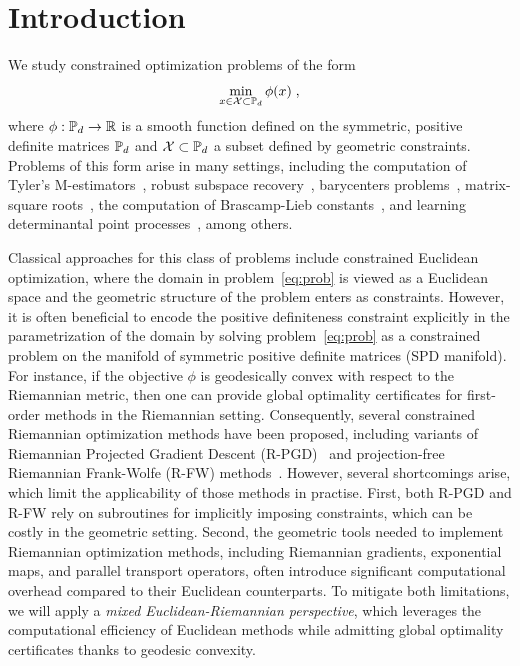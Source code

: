 \documentclass[sn-nature]{sn-jnl}%
\theoremstyle{thmstyleone}%
\theoremstyle{thmstyletwo}%
\theoremstyle{thmstylethree}%
\begin{document}
\section{Introduction}\label{sec1}

We study constrained optimization problems of the form
\begin{equation}\label{eq:prob}
	\min_{x \in \mathcal{X} \subset \mathbb{P}_d} \phi(x) \; ,
\end{equation}
where $\phi: \mathbb{P}_d \rightarrow \mathbb{R}$ is a smooth function defined on the 
symmetric, positive definite matrices $\mathbb{P}_d$ and $\mathcal{X} \subset \mathbb{P}_d$ a subset defined by geometric constraints. 
Problems of this form arise in many settings, including the computation of Tyler's M-estimators~\citep{tyler1987distribution,m-scatter,wiesel2012geodesic}, robust subspace recovery~\citep{zhang2016robust}, barycenters problems~\citep{sra2013sdivergence}, matrix-square roots~\citep{sra2015matrixsquareroot}, the computation of Brascamp-Lieb constants~\citep{weber2022computing}, and learning determinantal point processes~\citep{mariet2015fixed}, among others.

Classical approaches for this class of problems include constrained Euclidean optimization, where the domain in problem~\ref{eq:prob} is viewed as a Euclidean space and the geometric structure of the problem enters as constraints.  However, it is often beneficial to encode the positive definiteness constraint explicitly in the parametrization of the domain by solving problem~\ref{eq:prob} as a constrained problem on the manifold of symmetric positive definite matrices (SPD manifold). For instance, if the objective $\phi$ is geodesically convex with respect to the Riemannian metric, then one can provide global optimality certificates for first-order methods in the Riemannian setting. Consequently, several constrained Riemannian optimization methods have been proposed, including variants of Riemannian Projected Gradient Descent (R-PGD)~\cite{liu2019simple} and projection-free Riemannian Frank-Wolfe (R-FW) methods~\cite{frank-wolfe,weber2021projection}. 
However, several shortcomings arise, which limit the applicability of those methods in practise.  First, both R-PGD and R-FW rely on subroutines for implicitly imposing constraints, which can be costly in the geometric setting.  Second,  the geometric tools needed to implement Riemannian optimization methods, including Riemannian gradients, exponential maps, and parallel transport operators, often introduce significant computational overhead compared to their Euclidean counterparts.  To mitigate both limitations, we will apply a \emph{mixed Euclidean-Riemannian perspective}, which leverages the computational efficiency of Euclidean methods while admitting global optimality certificates thanks to geodesic convexity.
\end{document}
